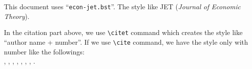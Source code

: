 \documentclass[10pt]{article}
\begin{document}
This document uses ``\verb|econ-jet.bst|''. The style like JET ({\itshape Journal of
Economic Theory}).

\vspace{1em}


\vspace*{1em}

In the citation part above, we use
\verb|\citet| command which creates the style like ``author name + number''. If we use \verb|\cite|
command, we have the style only with number like the followings: \\
\cite{Ryza15:_advan_analy_spark_patter_learn_data_scale},
\cite{yamazaki13:_japan}, \cite{stakeda2019web}, \cite{Takeda2012a},
\cite{bergemann11:_ration}, \cite{goldin:katz:2011}, \cite{Takeda2014a},
\cite{takeda2015a}.

\nocite{*}



\end{document}
